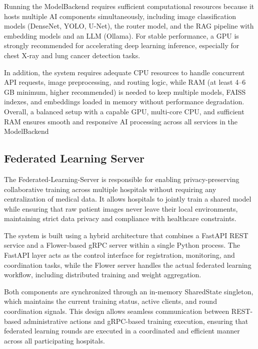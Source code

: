 Running the ModelBackend requires sufficient computational resources because it hosts multiple AI components simultaneously, including image classification models (DenseNet, YOLO, U-Net), the router model, and the RAG pipeline with embedding models and an LLM (Ollama). For stable performance, a GPU is strongly recommended for accelerating deep learning inference, especially for chest X-ray and lung cancer detection tasks.

In addition, the system requires adequate CPU resources to handle concurrent API requests, image preprocessing, and routing logic, while RAM (at least 4–6 GB minimum, higher recommended) is needed to keep multiple models, FAISS indexes, and embeddings loaded in memory without performance degradation. Overall, a balanced setup with a capable GPU, multi-core CPU, and sufficient RAM ensures smooth and responsive AI processing across all services in the ModelBackend

\subsection{Federated Learning Server}
The Federated-Learning-Server is responsible for enabling privacy-preserving collaborative training across multiple hospitals without requiring any centralization of medical data. It allows hospitals to jointly train a shared model while ensuring that raw patient images never leave their local environments, maintaining strict data privacy and compliance with healthcare constraints.

The system is built using a hybrid architecture that combines a FastAPI REST service and a Flower-based gRPC server within a single Python process. The FastAPI layer acts as the control interface for registration, monitoring, and coordination tasks, while the Flower server handles the actual federated learning workflow, including distributed training and weight aggregation.

Both components are synchronized through an in-memory SharedState singleton, which maintains the current training status, active clients, and round coordination signals. This design allows seamless communication between REST-based administrative actions and gRPC-based training execution, ensuring that federated learning rounds are executed in a coordinated and efficient manner across all participating hospitals.

